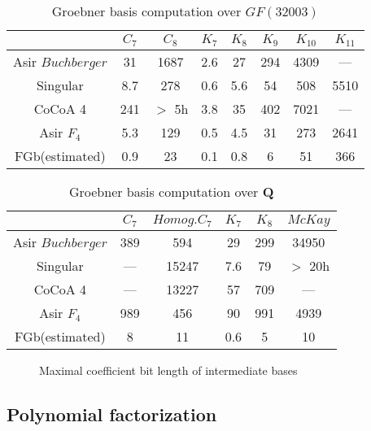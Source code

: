 \documentclass[runningheads]{cl2emult}
\begin{document}
\begin{table}[hbtp]
\begin{center}
\begin{tabular}{|c||c|c|c|c|c|c|c|} \hline
		& $C_7$ & $C_8$ & $K_7$ & $K_8$ & $K_9$ & $K_{10}$ & $K_{11}$ \\ \hline
Asir $Buchberger$	& 31 & 1687  & 2.6  & 27 & 294  & 4309 & --- \\ \hline
Singular & 8.7 & 278 & 0.6 & 5.6 & 54 & 508 & 5510 \\ \hline
CoCoA 4 & 241 & $>$ 5h & 3.8 & 35 & 402 &7021  & --- \\ \hline\hline
Asir $F_4$	& 5.3 & 129 & 0.5  & 4.5 & 31  & 273 & 2641 \\ \hline
FGb(estimated)	& 0.9 & 23 & 0.1 & 0.8 & 6 & 51 & 366 \\ \hline
\end{tabular}
\end{center}
\caption{Groebner basis computation over $GF(32003)$}
\label{gbmod}
\end{table}

\begin{table}[hbtp]
\begin{center}
\begin{tabular}{|c||c|c|c|c|c|} \hline
		& $C_7$ & $Homog. C_7$ & $K_7$ & $K_8$ & $McKay$ \\ \hline
Asir $Buchberger$ 	& 389 & 594 & 29 & 299 & 34950 \\ \hline
Singular & --- & 15247 & 7.6 & 79 & $>$ 20h \\ \hline
CoCoA 4 & --- & 13227 & 57 & 709 & --- \\ \hline\hline
Asir $F_4$ 	&  989 & 456 & 90 & 991 & 4939 \\ \hline
FGb(estimated)	& 8 &11 & 0.6 & 5 & 10 \\ \hline
\end{tabular}
\end{center}
\caption{Groebner basis computation over {\bf Q}}
\label{gbq}
\end{table}

\begin{figure}[hbtp]
\begin{center}
\epsfxsize=12cm
\end{center}
\caption{Maximal coefficient bit length of intermediate bases}
\label{f4vsbuch}
\end{figure}

\subsection{Polynomial factorization}
\end{document}

